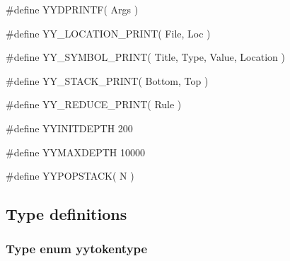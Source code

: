 \medskip
{\stt \#define YYDPRINTF( Args )}

\medskip
{\stt \#define YY\_LOCATION\_PRINT( File, Loc )}

\medskip
{\stt \#define YY\_SYMBOL\_PRINT( Title, Type, Value, Location )}

\medskip
{\stt \#define YY\_STACK\_PRINT( Bottom, Top )}

\medskip
{\stt \#define YY\_REDUCE\_PRINT( Rule )}

\medskip
{\stt \#define YYINITDEPTH 200}

\medskip
{\stt \#define YYMAXDEPTH 10000}

\medskip
{\stt \#define YYPOPSTACK( N )}


\subsection{Type definitions}


\subsubsection{Type enum yytokentype}
\label{type_enum_yytokentype_c-exp.c}

